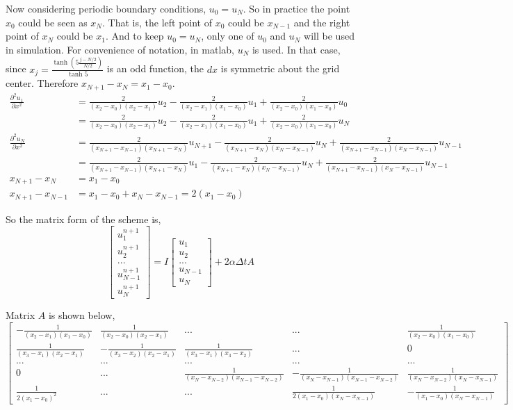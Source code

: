 \documentclass[letterpaper,10pt]{article}
\begin{document}
Now considering periodic boundary conditions, $u_0=u_N$. So in practice the point $x_0$ could be seen as $x_N$. That is, the left point of $x_0$ 
could be $x_{N-1}$ and the right point of $x_{N}$ could be $x_1$. And to keep $u_0=u_N$, only one of $u_0$ and $u_N$ will be used in simulation. 
For convenience of notation, in matlab, $u_N$ is used. In that case, since $x_j=\frac{\tanh\left(5\frac{j-N/2}{N/2}\right)}{\tanh 5}$ is an odd function, 
the $dx$ is symmetric about the grid center. Therefore $x_{N+1}-x_{N}=x_1-x_0$. 
\begin{align*}
  \frac{\partial^2 u_1}{\partial x^2}&=\frac{2}{(x_{2}-x_{0})(x_{2}-x_1)}u_{2}-\frac{2}{(x_{2}-x_{1})(x_1-x_{0})}u_1+\frac{2}{(x_{2}-x_{0})(x_1-x_{0})}u_{0}\\
  &=\frac{2}{(x_{2}-x_{0})(x_{2}-x_1)}u_{2}-\frac{2}{(x_{2}-x_{1})(x_1-x_{0})}u_1+\frac{2}{(x_{2}-x_{0})(x_1-x_{0})}u_{N}\\
  \frac{\partial^2 u_N}{\partial x^2}&=\frac{2}{(x_{N+1}-x_{N-1})(x_{N+1}-x_N)}u_{N+1}-\frac{2}{(x_{N+1}-x_{N})(x_N-x_{N-1})}u_N+\frac{2}{(x_{N+1}-x_{N-1})(x_N-x_{N-1})}u_{N-1}\\
  &=\frac{2}{(x_{N+1}-x_{N-1})(x_{N+1}-x_N)}u_{1}-\frac{2}{(x_{N+1}-x_{N})(x_N-x_{N-1})}u_N+\frac{2}{(x_{N+1}-x_{N-1})(x_N-x_{N-1})}u_{N-1}\\
  x_{N+1}-x_N&=x_1-x_0\\
  x_{N+1}-x_{N-1}&=x_1-x_0+x_N-x_{N-1}=2(x_1-x_0)
\end{align*}

So the matrix form of the scheme is, 
\begin{equation*}
  \begin{bmatrix}
    u_1^{n+1}\\u_2^{n+1}\\...\\u_{N-1}^{n+1}\\u_N^{n+1}
  \end{bmatrix} = 
  I \begin{bmatrix}
    u_1\\u_2\\...\\u_{N-1}\\u_N
  \end{bmatrix} + 2\alpha \Delta t A
\end{equation*}

Matrix $A$ is shown below, 
\begin{equation*}
  \begin{bmatrix}
    -\frac{1}{(x_{2}-x_{1})(x_1-x_{0})}&\frac{1}{(x_{2}-x_{0})(x_{2}-x_1)}&...&...&\frac{1}{(x_{2}-x_{0})(x_1-x_{0})}\\
    \frac{1}{(x_{3}-x_{1})(x_2-x_{1})}&-\frac{1}{(x_{3}-x_{2})(x_2-x_{1})}&\frac{1}{(x_{3}-x_{1})(x_{3}-x_2)}&...&0\\
    ...&...&...&...&...\\
    0&...&\frac{1}{(x_{N}-x_{N-2})(x_{N-1}-x_{N-2})}&-\frac{1}{(x_{N}-x_{N-1})(x_{N-1}-x_{N-2})}&\frac{1}{(x_{N}-x_{N-2})(x_{N}-x_{N-1})}\\
    \frac{1}{2(x_1-x_0)^2}&...&...&\frac{1}{2(x_1-x_0)(x_N-x_{N-1})}&-\frac{1}{(x_1-x_0)(x_N-x_{N-1})}
  \end{bmatrix}
\end{equation*}
\end{document}
